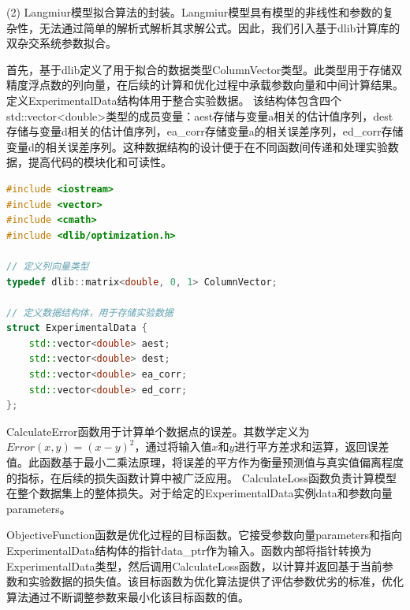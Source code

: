 (2) Langmiur模型拟合算法的封装。Langmiur模型具有模型的非线性和参数的复杂性，无法通过简单的解析式解析其求解公式。因此，我们引入基于dlib计算库的双杂交系统参数拟合。

首先，基于dlib定义了用于拟合的数据类型ColumnVector类型。此类型用于存储双精度浮点数的列向量，在后续的计算和优化过程中承载参数向量和中间计算结果。
定义ExperimentalData结构体用于整合实验数据。
该结构体包含四个std::vector<double>类型的成员变量：aest存储与变量a相关的估计值序列，dest存储与变量d相关的估计值序列，ea\_corr存储变量a的相关误差序列，ed\_corr存储变量d的相关误差序列。这种数据结构的设计便于在不同函数间传递和处理实验数据，提高代码的模块化和可读性。

\begin{lstlisting}[language=C++, caption={基于dlib的FRET双杂交求解器代码片段}]
#include <iostream>
#include <vector>
#include <cmath>
#include <dlib/optimization.h>

// 定义列向量类型
typedef dlib::matrix<double, 0, 1> ColumnVector;

// 定义数据结构体，用于存储实验数据
struct ExperimentalData {
    std::vector<double> aest;
    std::vector<double> dest;
    std::vector<double> ea_corr;
    std::vector<double> ed_corr;
};
\end{lstlisting}

CalculateError函数用于计算单个数据点的误差。其数学定义为$Error(x, y) = (x - y)^2$，通过将输入值$x$和$y$进行平方差求和运算，返回误差值。此函数基于最小二乘法原理，将误差的平方作为衡量预测值与真实值偏离程度的指标，在后续的损失函数计算中被广泛应用。
CalculateLoss函数负责计算模型在整个数据集上的整体损失。对于给定的ExperimentalData实例data和参数向量parameters。


ObjectiveFunction函数是优化过程的目标函数。它接受参数向量parameters和指向ExperimentalData结构体的指针data\_ptr作为输入。函数内部将指针转换为ExperimentalData类型，然后调用CalculateLoss函数，以计算并返回基于当前参数和实验数据的损失值。该目标函数为优化算法提供了评估参数优劣的标准，优化算法通过不断调整参数来最小化该目标函数的值。

